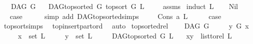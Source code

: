 \begin{isabellebody}
\ \ \ {\isachardoublequoteopen}DAG\ G{\isachardoublequoteclose}\isanewline
\ \ \ {\isachardoublequoteopen}DAG{\isachardot}{\kern0pt}top{\isacharunderscore}{\kern0pt}sorted\ G\ {\isacharparenleft}{\kern0pt}top{\isacharunderscore}{\kern0pt}sort\ G\ L{\isacharparenright}{\kern0pt}{\isachardoublequoteclose}\ \isanewline
%
\isadelimproof
\ \ %
\endisadelimproof
%
\isatagproof
{}\isamarkupfalse%
\ assms\ \isanewline
{}\isamarkupfalse%
{\isacharparenleft}{\kern0pt}induct\ L{\isacharparenright}{\kern0pt}\isanewline
\ \ \isamarkupfalse%
\ Nil\isanewline
\ \ \isamarkupfalse%
\ \isamarkupfalse%
\ {\isacharquery}{\kern0pt}case\isanewline
\ \ \ \ \isamarkupfalse%
\ {\isacharparenleft}{\kern0pt}simp\ add{\isacharcolon}{\kern0pt}\ DAG{\isachardot}{\kern0pt}top{\isacharunderscore}{\kern0pt}sorted{\isachardot}{\kern0pt}simps{\isacharparenleft}{\kern0pt}{}{\isacharparenright}{\kern0pt}{\isacharparenright}{\kern0pt}\ \isanewline
\ \ \isamarkupfalse%
\ {\isacharparenleft}{\kern0pt}Cons\ a\ L{\isacharparenright}{\kern0pt}\isanewline
\ \ \isamarkupfalse%
\ \isamarkupfalse%
\ {\isacharquery}{\kern0pt}case\ \isamarkupfalse%
\ top{\isacharunderscore}{\kern0pt}sort{\isachardot}{\kern0pt}simps\ \isamarkupfalse%
\ top{\isacharunderscore}{\kern0pt}insert{\isacharunderscore}{\kern0pt}part{\isacharunderscore}{\kern0pt}ord\ \isamarkupfalse%
\ auto\isanewline
{}\isamarkupfalse%
%
\endisatagproof
{\isafoldproof}%
%
\isadelimproof
\isanewline
%
\endisadelimproof
\isanewline
{}\isamarkupfalse%
\ top{\isacharunderscore}{\kern0pt}sorted{\isacharunderscore}{\kern0pt}rel{\isacharcolon}{\kern0pt}\ \isanewline
\ \ \ {\isachardoublequoteopen}DAG\ G{\isachardoublequoteclose}\isanewline
\ \ \ \ \ {\isachardoublequoteopen}y\ {\isasymrightarrow}\isactrlsup {\isacharplus}{\kern0pt}\isactrlbsub G\isactrlesub \ x{\isachardoublequoteclose}\isanewline
\ \ \ \ \ {\isachardoublequoteopen}x\ {\isasymin}\ set\ L{\isachardoublequoteclose}\isanewline
\ \ \ \ \ {\isachardoublequoteopen}y\ {\isasymin}\ set\ L{\isachardoublequoteclose}\isanewline
\ \ \ \ \ {\isachardoublequoteopen}DAG{\isachardot}{\kern0pt}top{\isacharunderscore}{\kern0pt}sorted\ G\ L{\isachardoublequoteclose}\isanewline
\ \ \ {\isachardoublequoteopen}{\isacharparenleft}{\kern0pt}x{\isacharcomma}{\kern0pt}y{\isacharparenright}{\kern0pt}\ {\isasymin}\ list{\isacharunderscore}{\kern0pt}to{\isacharunderscore}{\kern0pt}rel\ L{\isachardoublequoteclose}\isanewline

\end{isabellebody}
